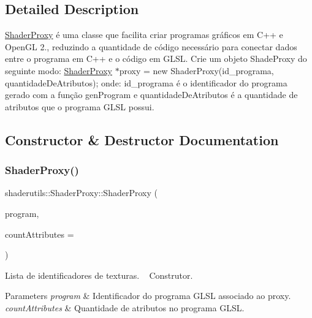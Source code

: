 \subsection{Detailed Description}
\mbox{\hyperlink{classshaderutils_1_1_shader_proxy}{Shader\+Proxy}} é uma classe que facilita criar programas gráficos em C++ e Open\+GL 2., reduzindo a quantidade de código necessário para conectar dados entre o programa em C++ e o código em G\+L\+SL. Crie um objeto Shade\+Proxy do seguinte modo\+: {\ttfamily  \mbox{\hyperlink{classshaderutils_1_1_shader_proxy}{Shader\+Proxy}} $\ast$proxy = new Shader\+Proxy(id\+\_\+programa, quantidade\+De\+Atributos); } onde\+: id\+\_\+programa é o identificador do programa gerado com a função gen\+Program e quantidade\+De\+Atributos é a quantidade de atributos que o programa G\+L\+SL possui. 

\subsection{Constructor \& Destructor Documentation}
\mbox{\label{classshaderutils_1_1_shader_proxy_aeb8e71b91f4b2871dadc9152ead5d05a}} 
\subsubsection{\texorpdfstring{Shader\+Proxy()}{ShaderProxy()}}
{\footnotesize\ttfamily shaderutils\+::\+Shader\+Proxy\+::\+Shader\+Proxy (\begin{DoxyParamCaption}\item[{G\+Luint}]{program,  }\item[{G\+Luint}]{count\+Attributes = {} }\end{DoxyParamCaption})\hspace{0.3cm}{\ttfamily [inline]}}

Lista de identificadores de texturas. ~\newline
Construtor. 
\begin{DoxyParams}{Parameters}
{\em program} & Identificador do programa G\+L\+SL associado ao proxy. \\
\hline
{\em count\+Attributes} & Quantidade de atributos no programa G\+L\+SL. \\
\hline
\end{DoxyParams}


